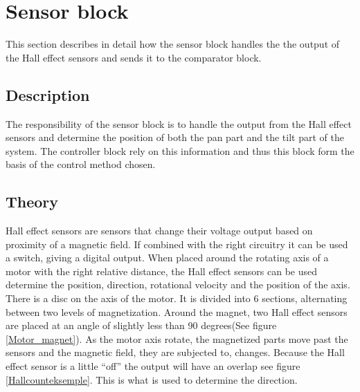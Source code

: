 \section{Sensor block}
This section describes in detail how the sensor block handles the the output of the Hall effect sensors and sends it to the comparator block.

\subsection{Description}
The responsibility of the sensor block is to handle the output from the Hall effect sensors and determine the position of both the pan part and the tilt part of the system. The controller block rely on this information and thus this block form the basis of the control method chosen.

\subsection{Theory}
Hall effect sensors are sensors that change their voltage output based on proximity of a magnetic field. If combined with the right circuitry it can be used a switch, giving a digital output. When placed around the rotating axis of a motor with the right relative distance, the Hall effect sensors can be used determine the position, direction, rotational velocity and the position of the axis.
There is a disc on the axis of the motor. It is divided into 6 sections, alternating between two levels of magnetization. Around the magnet, two Hall effect sensors are placed at an angle of slightly less than 90 degrees(See figure \ref{Motor_magnet}). As the motor axis rotate, the magnetized parts move past the sensors and the magnetic field, they are subjected to, changes. Because the Hall effect sensor is a little “off” the output will have an overlap see figure \ref{Hallcounteksemple}. This is what is used to determine the direction.

